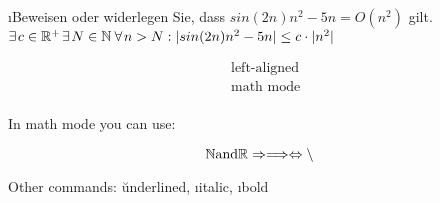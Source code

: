 \documentclass{blatt}
\begin{document}

%
%
 \\
\i{Beweisen oder widerlegen Sie, dass $sin(2n)n^2 -5n = O(n^2)$ gilt.} \\

\zz $\exists \+ c \in \R^{+} \+\exists\+ N \in \N \+\+\forall\+ n > N: |sin(2n)n^2 -5n| \leq c \cdot |n^2|$

\begin{align*}
    &\text{left-aligned} \\
    &\text{math mode} \\
\end{align*}

In math mode you can use:

\[
  \mathbb{N} \text{and} \mathbb{R} \Rightarrow \Longrightarrow \Leftrightarrow \setminus 
\]

Other commands:
\u{underlined}, \i{italic}, \i{bold}

\proven
\end{document}
